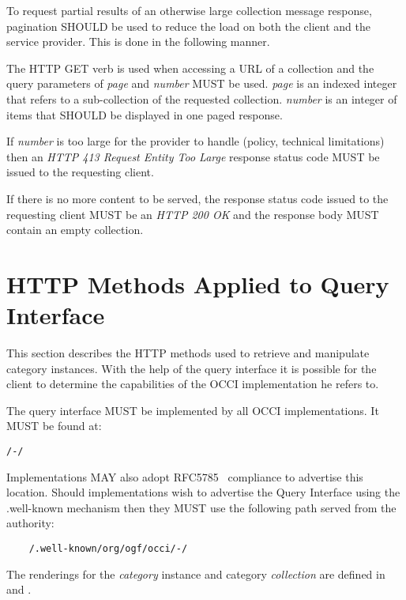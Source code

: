 \documentclass[10pt,a4paper]{article}
\begin{document}
To request partial results of an otherwise large collection message response, pagination SHOULD be used to reduce the load on
both the client and the service provider. This is done in the following manner.

The HTTP GET verb is used when accessing a URL of a collection and the query parameters of {\em page} and {\em number} MUST be used. {\em page} is an indexed
integer that refers to a sub-collection of the requested collection. {\em number} is an integer of items that SHOULD be displayed in one paged response.


If {\em number} is too large for the provider to handle (policy, technical limitations) then an \emph{HTTP 413 Request Entity Too Large} response status code MUST be issued to the requesting client.

If there is no more content to be served, the response status code issued to the requesting client MUST be an \emph{HTTP 200 OK} and the response body MUST contain an empty collection.

\section{HTTP Methods Applied to Query Interface}
\label{sec:http_methods_qi}

This section describes the HTTP methods used to retrieve and manipulate category instances.  With the help of the query interface it is possible for the client to determine the capabilities of the OCCI implementation he refers to.

The query interface MUST be implemented by all OCCI implementations. It MUST be found at:

\begin{verbatim}
/-/
\end{verbatim}

Implementations MAY also adopt RFC5785~\cite{rfc5785} compliance to advertise this location. Should implementations wish to advertise the Query Interface using the .well-known mechanism then they MUST use the following path served from the authority:

\begin{verbatim}
	/.well-known/org/ogf/occi/-/
\end{verbatim}

The renderings for the {\em category} instance and category {\em collection} are defined in \cite{occi:text} and \cite{occi:json}.
\end{document}

